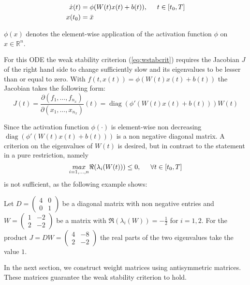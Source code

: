 \documentclass[a4paper, 12pt]{scrreprt} %
\DeclareMathOperator*{\diag}{diag}
\begin{document}
\begin{align}
\dot x(t) &= \phi(W(t) x(t) + b(t)) , \hspace{0.5cm}t\in [t_0,T] \\
x(t_0) &= \bar{x} 
\end{align} 

$\phi(x)$ denotes the element-wise application of the activation function $\phi$ on $x\in\mathbb{R}^n$.

For this \ac{ODE} the weak stability criterion (\ref{eq:wstabcrit}) requires the Jacobian $J$ of the right hand side to change sufficiently slow and its eigenvalues to be lesser than or equal to zero. 
With $f(t, x(t)) = \phi(W(t) x(t) + b(t))$ the Jacobian takes the following form:
\begin{equation}
J(t) = \frac{\partial (f_1, \dots, f_{n_x})}{\partial (x_1, \dots, x_{n_x})}(t) = \diag(\phi'(W(t) x(t) + b(t))) W(t)
\label{eq:jac}
\end{equation}

Since the activation function $\phi(\cdot)$ is element-wise non decreasing $\diag(\phi'(W(t) x(t) + b(t)))$ is a non negative diagonal matrix. A criterion on the eigenvalues of $W(t)$ is desired, but in contrast to the statement in \cite{safdnn} a pure restriction, namely
\begin{equation*}
\underset{i=1,\dots,n}{max}\Re(\lambda_i(W(t))) \leq 0, \hspace{0.5cm}\forall t \in [t_0,T]
\end{equation*}
is not sufficient, as the following example shows:

\begin{myExample}
Let $D = \begin{pmatrix}
	4 & 0 \\
	0 & 1
\end{pmatrix}$ be a diagonal matrix with non negative entries and $W = \begin{pmatrix}
	1 & -2 \\
	2 & -2
\end{pmatrix}$ be a matrix with $\Re(\lambda_i(W)) = -\frac{1}{2}$ for $i=1,2$. For the product $J = D W = \begin{pmatrix}
	4 & -8 \\
	2 & -2
\end{pmatrix}$ the real parts of the two eigenvalues take the value $1$.
\end{myExample}

In the next section, we construct weight matrices using antisymmetric matrices. These matrices guarantee the weak stability criterion to hold.
\end{document}
